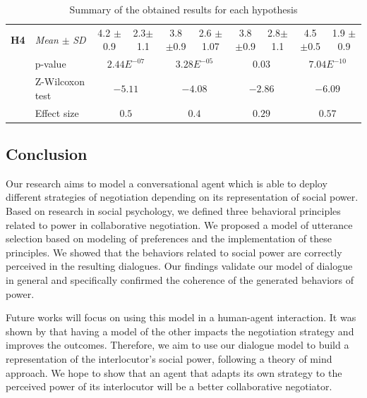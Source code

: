 \documentclass{llncs}
\begin{document}
\begin{table}[t]
{\begin{tabular}{|ll|c|c|c|c|c|c|c|c|}
					\newline \multirow{4}{*} {\textbf{H4}} & \multicolumn{1}{|l|}{ \textit{Mean} $\pm$ \textit{SD} } & 4.2 $\pm$ 0.9 & 2.3$\pm$ 1.1  & 3.8 $\pm$0.9 & 2.6 $\pm$1.07 & 3.8 $\pm$0.9  & 2.8$\pm$ 1.1  & 4.5 $\pm$0.5  & 1.9 $\pm$ 0.9\\
					\cline{2-10}
					\newline & \multicolumn{1}{|l|}{p-value} & \multicolumn{2}{c|}{ $2.44E^{-07}$} & \multicolumn{2}{c|}{ $3.28E^{-05}$} & \multicolumn{2}{c|}{ $0.03$}& \multicolumn{2}{c|}{ $7.04E^{-10}$}\\
					\cline{2-10}	
					\newline & \multicolumn{1}{|l|}{Z-Wilcoxon test} & \multicolumn{2}{c|}{ $-5.11$} & \multicolumn{2}{c|}{ $-4.08$} & \multicolumn{2}{c|}{ $-2.86$}& \multicolumn{2}{c|}{ $-6.09$}\\
					\cline{2-10}	
					\newline & \multicolumn{1}{|l|}{Effect size} & \multicolumn{2}{c|}{ $0.5$} & \multicolumn{2}{c|}{ $0.4$} & \multicolumn{2}{c|}{ $0.29$}& \multicolumn{2}{c|}{ $0.57$}\\
					\hline	
				\end{tabular}
			}
			\caption{Summary of the obtained results for each hypothesis}
			\label{res}
		\end{table}
		
		\subsection{Conclusion}
		
		Our research aims to model a conversational agent which is able to deploy different strategies of negotiation depending on its representation of social power. Based on research in social psychology, we defined three behavioral principles related to power in collaborative negotiation. We proposed a model of utterance selection based on modeling of preferences and the implementation of these principles. We showed that the behaviors related to social power are correctly perceived in the resulting dialogues. Our findings validate our model of dialogue in general and specifically confirmed the coherence of the generated behaviors of power.
		
		Future works will focus on using this model in a human-agent interaction. It was shown by \cite{klatt2011negotiations} that having a model of the other impacts the negotiation strategy and improves the outcomes. Therefore, we aim to use our dialogue model to build a representation of the interlocutor's social power, following a theory of mind approach. We hope to show that an agent that adapts its own strategy to the perceived power of its interlocutor will be a better collaborative negotiator.		
		
		
		
		\scriptsize{	
			
			}
		
		

%
\end{document}
